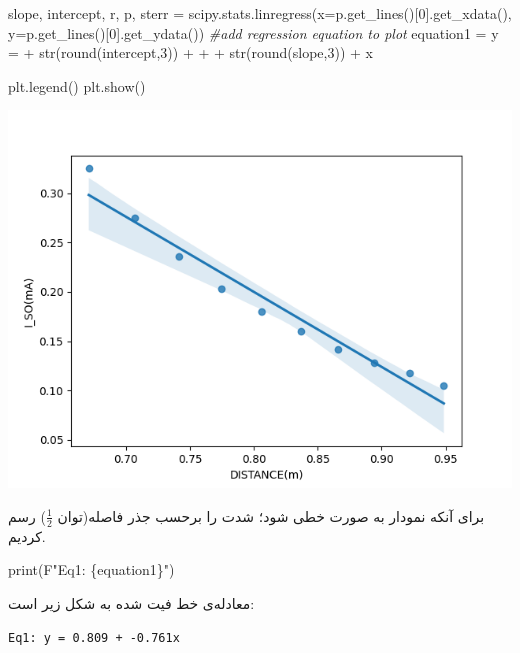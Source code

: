 \documentclass{article}
\newenvironment{Shaded}{}{}
\newcommand{\BuiltInTok}[1]{#1}
\newcommand{\CommentTok}[1]{\textcolor[rgb]{0.38,0.63,0.69}{\textit{#1}}}
\newcommand{\DecValTok}[1]{\textcolor[rgb]{0.25,0.63,0.44}{#1}}
\newcommand{\NormalTok}[1]{#1}
\newcommand{\OperatorTok}[1]{\textcolor[rgb]{0.40,0.40,0.40}{#1}}
\newcommand{\SpecialCharTok}[1]{\textcolor[rgb]{0.25,0.44,0.63}{#1}}
\newcommand{\SpecialStringTok}[1]{\textcolor[rgb]{0.73,0.40,0.53}{#1}}
\newcommand{\StringTok}[1]{\textcolor[rgb]{0.25,0.44,0.63}{#1}}
\begin{document}
\begin{latin}
\begin{Shaded}
\begin{Highlighting}[]
\NormalTok{slope, intercept, r, p, sterr }\OperatorTok{=}\NormalTok{ scipy.stats.linregress(x}\OperatorTok{=}\NormalTok{p.get\_lines()[}\DecValTok{0}\NormalTok{].get\_xdata(),}
\NormalTok{                                                       y}\OperatorTok{=}\NormalTok{p.get\_lines()[}\DecValTok{0}\NormalTok{].get\_ydata())}
\CommentTok{\#add regression equation to plot}
\NormalTok{equation1 }\OperatorTok{=} \StringTok{\textquotesingle{}y = \textquotesingle{}} \OperatorTok{+} \BuiltInTok{str}\NormalTok{(}\BuiltInTok{round}\NormalTok{(intercept,}\DecValTok{3}\NormalTok{)) }\OperatorTok{+} \StringTok{\textquotesingle{} + \textquotesingle{}} \OperatorTok{+} \BuiltInTok{str}\NormalTok{(}\BuiltInTok{round}\NormalTok{(slope,}\DecValTok{3}\NormalTok{)) }\OperatorTok{+} \StringTok{\textquotesingle{}x\textquotesingle{}}

\NormalTok{plt.legend()}
\NormalTok{plt.show()}
\end{Highlighting}
\end{Shaded}
\begin{center}
\includegraphics[scale=0.75]{I_SO.png}	
\end{center}
\end{latin}
\newpage

برای آنکه نمودار به صورت خطی شود؛ شدت را برحسب جذر فاصله(توان $\frac{1}{2}$) رسم کردیم.
\begin{latin}
\begin{Highlighting}
\BuiltInTok{print}\NormalTok{(}\SpecialStringTok{F"Eq1: }\SpecialCharTok{\{}\NormalTok{equation1}\SpecialCharTok{\}}\SpecialStringTok{"}\NormalTok{)}
\end{Highlighting}
\end{latin}
معادله‌ی خط فیت شده به شکل زیر است:
\begin{latin}
\begin{verbatim}
Eq1: y = 0.809 + -0.761x
\end{verbatim}
\end{latin}
\end{document}
